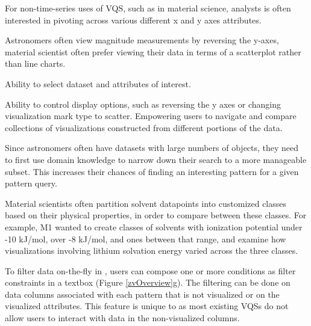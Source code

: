 \problemlist
  \item For non-time-series uses of VQS, such as in material science, analysts is often interested in pivoting across various different x and y axes attributes.
  \item Astronomers often view magnitude measurements by reversing the y-axes, material scientist often prefer viewing their data in terms of a scatterplot rather than line charts.
\enumend
\featurelist
  \item Ability to select dataset and attributes of interest.
  \item Ability to control display options, such as reversing the y axes or changing visualization mark type to scatter.
\enumend
 Empowering users to navigate and compare collections of visualizations constructed from different portions of the data.
\problemlist
  \item Since astronomers often have datasets with large numbers of objects, they need to first use domain knowledge
  to narrow down their search to a more manageable subset. This increases their chances of finding an interesting pattern for a given pattern query.
  \item Material scientists often partition solvent datapoints into customized classes based on their physical properties, in order to compare between these classes. For example, M1 wanted to create classes of solvents with ionization potential under -10 kJ/mol, over -8 kJ/mol, and ones between that range, and examine how visualizations involving lithium solvation energy varied across the three classes.
\enumend
\featurelist
  \item To filter data on-the-fly in \zvpp, users can compose one or more conditions as filter constraints in a textbox (Figure \ref{zvOverview}g). The filtering can be done on data columns associated with each pattern that is not visualized or on the visualized attributes. This feature is unique to \zvpp as most existing VQSs do not allow users to interact with data in the non-visualized columns.
